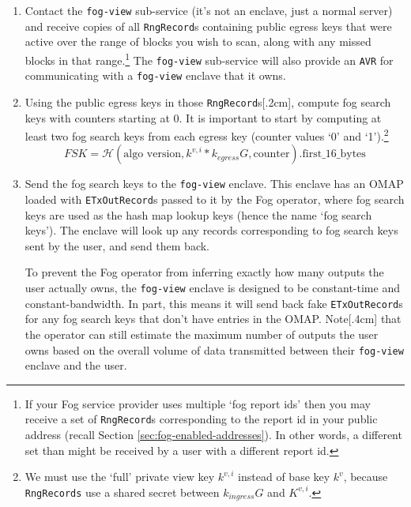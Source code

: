\begin{enumerate}
    \item Contact the {\tt fog-view} sub-service (it's not an enclave, just a normal server) and receive copies of all {\tt RngRecord}s containing public egress keys that were active over the range of blocks you wish to scan, along with any missed blocks in that range.\footnote{If your Fog service provider uses multiple `fog report ids' then you may receive a set of {\tt RngRecord}s corresponding to the report id in your public address (recall Section \ref{sec:fog-enabled-addresses}). In other words, a different set than might be received by a user with a different report id.} The {\tt fog-view} sub-service will also provide an {\tt AVR} for communicating with a {\tt fog-view} enclave that it owns.

    \item Using the public egress keys in those {\tt RngRecord}s[.2cm], compute fog search keys with counters starting at 0. It is important to start by computing at least two fog search keys from each egress key (counter values `0' and `1').\footnote{We must use the `full' private view key $k^{v,i}$ instead of base key $k^v$, because {\tt RngRecords} use a shared secret between $k_{ingress} G$ and $K^{v,i}$.}\vspace{.155cm}
    \[FSK = \mathcal{H}(\textrm{algo version}, k^{v,i}*k_{egress} G, \textrm{counter})\textrm{.first\_16\_bytes}\]

    \item Send the fog search keys to the {\tt fog-view} enclave. This enclave has an OMAP loaded with {\tt ETxOutRecord}s passed to it by the Fog operator, where fog search keys are used as the hash map lookup keys (hence the name `fog search keys'). The enclave will look up any records corresponding to fog search keys sent by the user, and send them back.

    To prevent the Fog operator from inferring exactly how many outputs the user actually owns, the {\tt fog-view} enclave is designed to be constant-time and constant-bandwidth. In part, this means it will send back fake {\tt ETxOutRecord}s for any fog search keys that don't have entries in the OMAP. Note[.4cm] that the operator can still estimate the maximum number of outputs the user owns based on the overall volume of data transmitted between their {\tt fog-view} enclave and the user.


\end{enumerate}
